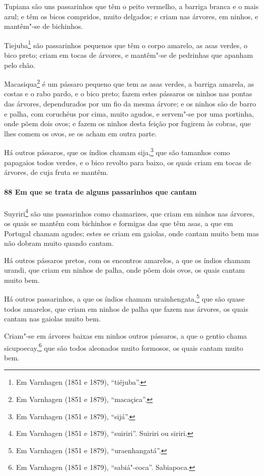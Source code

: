 Tupiana são uns passarinhos que têm o peito vermelho, a barriga branca e o mais azul; e
têm os bicos compridos, muito delgados; e criam nas árvores, em ninhos, e mantêm"-se de
bichinhos.

Tiejuba\footnote{ Em Varnhagen (1851 e 1879), ``tiéjuba''.} são passarinhos pequenos que
têm o corpo amarelo, as asas verdes, o bico preto; criam em tocas de árvores, e mantêm"-se
de pedrinhas que apanham pelo chão.

Macasiqua\footnote{ Em Varnhagen (1851 e 1879), ``macaçica''.} é um pássaro pequeno que
tem as asas verdes, a barriga amarela, as costas e o rabo pardo, e o bico preto; fazem
estes pássaros os ninhos nas pontas das árvores, dependurados por um fio da mesma árvore;
e os ninhos são de barro e palha, com coruchéus por cima, muito agudos, e servem"-se por
uma portinha, onde põem dois ovos; e fazem os ninhos desta feição por fugirem às cobras,
que lhes comem os ovos, se os acham em outra parte.

Há outros pássaros, que os índios chamam sija,\footnote{ Em Varnhagen (1851 e 1879),
``sijá''.} que são tamanhos como papagaios todos verdes, e o bico revolto para baixo, os
quais criam em tocas de árvores, de cuja fruta se mantêm.

\paragraph{88 Em que se trata de alguns passarinhos que cantam}

Suyriri\footnote{ Em Varnhagen (1851 e 1879), ``suiriri''. Suiriri ou siriri.} são uns
passarinhos como chamarizes, que criam em ninhos nas árvores, os quais se mantêm com
bichinhos e formigas das que têm asas, a que em Portugal chamam agudes; estes se criam em
gaiolas, onde cantam muito bem mas não dobram muito quando cantam.

Há outros pássaros pretos, com os encontros amarelos, a que os índios chamam urandi, que
criam em ninhos de palha, onde põem dois ovos, os quais cantam muito bem.

Há outros passarinhos, a que os índios chamam urainhengata,\footnote{ Em Varnhagen (1851 e
1879), ``uraenhangatá''.} que são quase todos amarelos, que criam em ninhos de palha que
fazem nas árvores, os quais cantam nas gaiolas muito bem.

Criam"-se em árvores baixas em ninhos outros pássaros, a que o gentio chama
sicupoecay,\footnote{ Em Varnhagen (1851 e 1879), ``sabiá"-coca''. Sabiapoca.} que são
todos aleonados muito formosos, os quais cantam muito bem.



